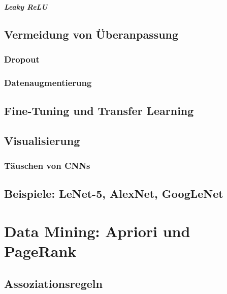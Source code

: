 				\paragraph{Leaky ReLU} %

	\section{Vermeidung von Überanpassung} %

		\subsection{Dropout} %

		\subsection{Datenaugmentierung} %

	\section{Fine-Tuning und Transfer Learning} %

	\section{Visualisierung} %

		\subsection{Täuschen von CNNs} %

	\section{Beispiele: LeNet-5, AlexNet, GoogLeNet} %

\chapter{Data Mining: Apriori und PageRank} %

	\section{Assoziationsregeln} %

